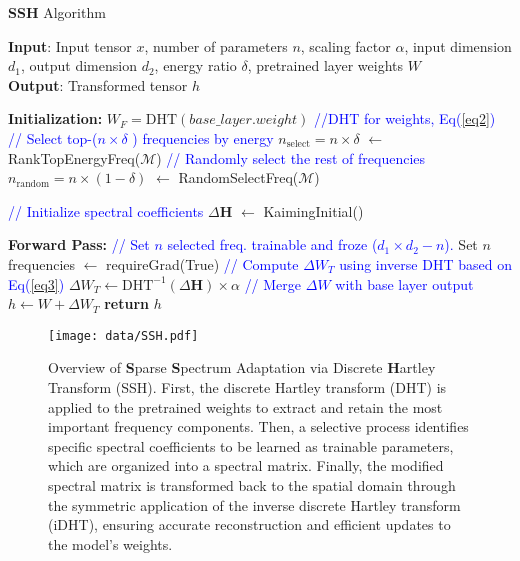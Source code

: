 
\begin{algorithm}[t!]
\footnotesize
\caption{\textbf{SSH} Algorithm}
\label{alg:SSH}
\textbf{Input}: Input tensor $x$, number of parameters $n$, scaling factor $\alpha$, input dimension $d_1$, output dimension $d_2$, energy ratio $\delta$, pretrained layer weights $W$\\
\textbf{Output}: Transformed tensor $h$
\begin{algorithmic}[1]
\STATE \textbf{Initialization:}
\STATE $W_{F} = \text{DHT}(base\_layer.weight)$  \textcolor{blue}{//DHT for weights, Eq(\ref{eq2})}
\STATE  \textcolor{blue}{// Select top-($n \times \delta $ ) frequencies by energy}
\STATE $n_{\text{select}} = n \times \delta $ $\leftarrow$ RankTopEnergyFreq($\mathcal{M}$)
\STATE \textcolor{blue}{// Randomly select the rest of frequencies}
\STATE $n_{\text{random}} = n \times (1-\delta) $ $\leftarrow$ RandomSelectFreq($\mathcal{M}$)

\STATE \textcolor{blue}{// Initialize spectral coefficients}
\STATE $\Delta \mathbf{H}$ $\leftarrow$ KaimingInitial()

\STATE \textbf{Forward Pass:}
\STATE \textcolor{blue}{// Set $n$ selected freq. trainable and froze ($d_1 \times d_2 - n$).}
\STATE Set $n$ frequencies $\leftarrow$ requireGrad(True)
\STATE \textcolor{blue}{// Compute $\Delta W_T$ using inverse DHT based on Eq(\ref{eq3})}
\STATE $\Delta W_T \leftarrow \text{DHT}^{-1}(\Delta \mathbf{H}) \times \alpha$
\STATE \textcolor{blue}{// Merge $\Delta W$ with base layer output} 
\STATE $h \leftarrow W + \Delta W_T$
\STATE \textbf{return} $h$
\end{algorithmic}
\end{algorithm}



\begin{figure*}
    \centering
    \texttt{[image: data/SSH.pdf]}
    \caption{\small 
    Overview of \textbf{S}parse \textbf{S}pectrum Adaptation via Discrete \textbf{H}artley Transform (SSH). First, the discrete Hartley transform (DHT) is applied to the pretrained weights to extract and retain the most important frequency components. Then, a selective process identifies specific spectral coefficients to be learned as trainable parameters, which are organized into a spectral matrix. Finally, the modified spectral matrix is transformed back to the spatial domain through the symmetric application of the inverse discrete Hartley transform (iDHT), ensuring accurate reconstruction and efficient updates to the model's weights.
    }
    \label{fig:SSH}
\end{figure*}

